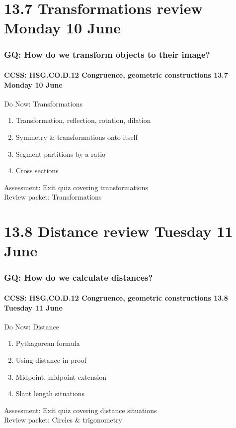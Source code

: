 \documentclass{beamer}
\begin{document}
  \section{13.7 Transformations review Monday 10 June}
    \frame
    {
      \frametitle{GQ: How do we transform objects to their image?}
      \framesubtitle{CCSS: HSG.CO.D.12 Congruence, geometric constructions \hfill \alert{13.7 Monday 10 June}}

      \begin{block}{Do Now: Transformations}
        \begin{enumerate}
          \item Transformation, reflection, rotation, dilation
          \item Symmetry \& transformations onto itself
          \item Segment partitions by a ratio
          \item Cross sections
        \end{enumerate}
      \end{block}
      Assessment: Exit quiz covering transformations\\
      Review packet: Transformations
    }

  \section{13.8 Distance review Tuesday 11 June}
    \frame
    {
      \frametitle{GQ: How do we calculate distances?}
      \framesubtitle{CCSS: HSG.CO.D.12 Congruence, geometric constructions \hfill \alert{13.8 Tuesday 11 June}}

      \begin{block}{Do Now: Distance}
        \begin{enumerate}
          \item Pythagorean formula
          \item Using distance in proof
          \item Midpoint, midpoint extension
          \item Slant length situations
        \end{enumerate}
      \end{block}
      Assessment: Exit quiz covering distance situations\\
      Review packet: Circles \& trigonometry
    }
\end{document}
